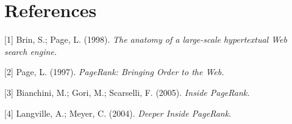 \documentclass[%
    final,
    notitlepage,
    narroweqnarray,
    inline,
    twoside,
    invited
    ]{lib/ieee}
\begin{document}
%
%
%
%
%

\newpage

\section{References}

    [1] Brin, S.; Page, L. (1998). \emph{The anatomy of a large-scale hypertextual Web search engine.}

    [2] Page, L. (1997). \emph{PageRank: Bringing Order to the Web.}

    [3] Bianchini, M.; Gori, M.; Scarselli, F. (2005). \emph{Inside PageRank.}

    [4] Langville, A.; Meyer, C. (2004). \emph{Deeper Inside PageRank.}
\end{document}
